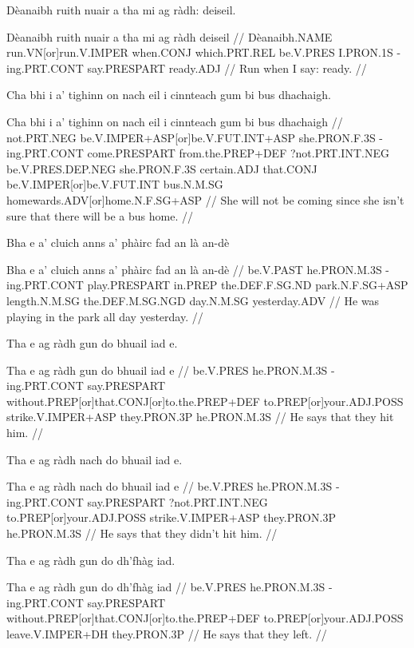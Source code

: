 \documentclass[a4paper,10pt]{article}
\begin{document}
\ex
\begingl
\glpre Dèanaibh ruith nuair a tha mi ag ràdh: deiseil. 

\vspace{4mm}
\gla Dèanaibh ruith nuair a tha mi ag ràdh deiseil  //
\glb Dèanaibh.NAME run.VN[or]run.V.IMPER when.CONJ which.PRT.REL be.V.PRES I.PRON.1S -ing.PRT.CONT say.PRESPART ready.ADJ  //
\glft Run when I say: ready. //
\endgl
\xe

\ex
\begingl
\glpre Cha bhi i a' tighinn on nach eil i cinnteach gum bi bus dhachaigh. 

\vspace{4mm}
\gla Cha bhi i a' tighinn on nach eil i cinnteach gum bi bus dhachaigh  //
\glb not.PRT.NEG be.V.IMPER+ASP[or]be.V.FUT.INT+ASP she.PRON.F.3S -ing.PRT.CONT come.PRESPART from.the.PREP+DEF ?not.PRT.INT.NEG be.V.PRES.DEP.NEG she.PRON.F.3S certain.ADJ that.CONJ be.V.IMPER[or]be.V.FUT.INT bus.N.M.SG homewards.ADV[or]home.N.F.SG+ASP  //
\glft She will not be coming since she isn't sure that there will be a bus home. //
\endgl
\xe

\ex
\begingl
\glpre Bha e a' cluich anns a' phàirc fad an là an-dè 

\vspace{4mm}
\gla Bha e a' cluich anns a' phàirc fad an là an-dè  //
\glb be.V.PAST he.PRON.M.3S -ing.PRT.CONT play.PRESPART in.PREP the.DEF.F.SG.ND park.N.F.SG+ASP length.N.M.SG the.DEF.M.SG.NGD day.N.M.SG yesterday.ADV  //
\glft He was playing in the park all day yesterday. //
\endgl
\xe

\ex
\begingl
\glpre Tha e ag ràdh gun do bhuail iad e. 

\vspace{4mm}
\gla Tha e ag ràdh gun do bhuail iad e  //
\glb be.V.PRES he.PRON.M.3S -ing.PRT.CONT say.PRESPART without.PREP[or]that.CONJ[or]to.the.PREP+DEF to.PREP[or]your.ADJ.POSS strike.V.IMPER+ASP they.PRON.3P he.PRON.M.3S  //
\glft He says that they hit him. //
\endgl
\xe

\ex
\begingl
\glpre Tha e ag ràdh nach do bhuail iad e. 

\vspace{4mm}
\gla Tha e ag ràdh nach do bhuail iad e  //
\glb be.V.PRES he.PRON.M.3S -ing.PRT.CONT say.PRESPART ?not.PRT.INT.NEG to.PREP[or]your.ADJ.POSS strike.V.IMPER+ASP they.PRON.3P he.PRON.M.3S  //
\glft He says that they didn't hit him. //
\endgl
\xe

\ex
\begingl
\glpre Tha e ag ràdh gun do dh'fhàg iad. 

\vspace{4mm}
\gla Tha e ag ràdh gun do dh'fhàg iad  //
\glb be.V.PRES he.PRON.M.3S -ing.PRT.CONT say.PRESPART without.PREP[or]that.CONJ[or]to.the.PREP+DEF to.PREP[or]your.ADJ.POSS leave.V.IMPER+DH they.PRON.3P  //
\glft He says that they left. //
\endgl
\xe
\end{document}
